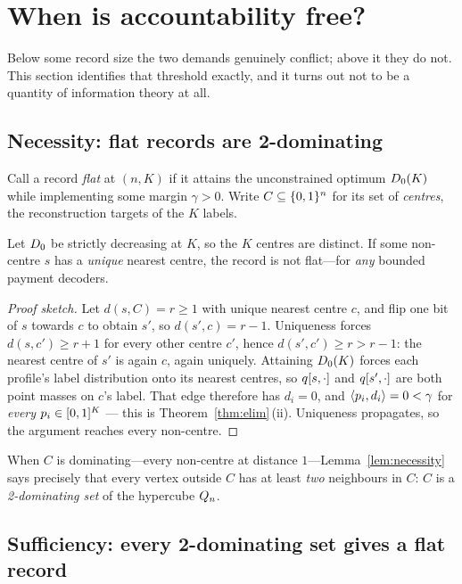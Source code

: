 \section{When is accountability free?}
\label{sec:threshold}

Below some record size the two demands genuinely conflict; above it they do not.
This section identifies that threshold exactly, and it turns out not to be a
quantity of information theory at all.

\subsection{Necessity: flat records are 2-dominating}

Call a record \emph{flat} at $(n,K)$ if it attains the unconstrained optimum
$D_0(K)$ while implementing some margin $\gamma > 0$. Write $C \subseteq \{0,1\}^n$
for its set of \emph{centres}, the reconstruction targets of the $K$ labels.

\begin{lemma}[Necessity]
\label{lem:necessity}
Let $D_0$ be strictly decreasing at $K$, so the $K$ centres are distinct.
If some non-centre $s$ has a \emph{unique} nearest centre, the record is not
flat---for \emph{any} bounded payment decoders.
\end{lemma}

\begin{proof}[Proof sketch]
Let $d(s,C) = r \ge 1$ with unique nearest centre $c$, and flip one bit of $s$
towards $c$ to obtain $s'$, so $d(s',c) = r-1$. Uniqueness forces
$d(s,c') \ge r+1$ for every other centre $c'$, hence $d(s',c') \ge r > r-1$: the
nearest centre of $s'$ is again $c$, again uniquely. Attaining $D_0(K)$ forces
each profile's label distribution onto its nearest centres, so $q[s,\cdot]$
and $q[s',\cdot]$ are both point masses on $c$'s label. That edge therefore
has $d_i = 0$, and $\langle p_i, d_i \rangle = 0 < \gamma$ for
\emph{every} $p_i \in [0,1]^K$ --- this is Theorem~\ref{thm:elim}\,(ii).
Uniqueness propagates, so the argument reaches every non-centre.
\end{proof}

When $C$ is dominating---every non-centre at distance $1$---Lemma~\ref{lem:necessity}
says precisely that every vertex outside $C$ has at least \emph{two} neighbours
in $C$: $C$ is a \emph{2-dominating set} of the hypercube $Q_n$.

\subsection{Sufficiency: every 2-dominating set gives a flat record}

